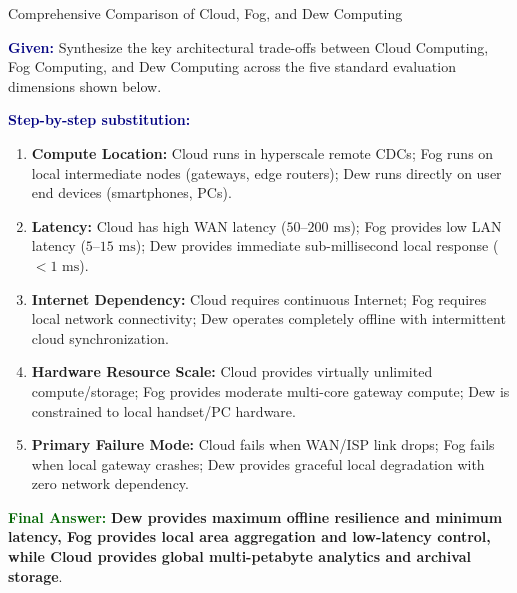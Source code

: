 \documentclass[11pt,a4paper,openany]{report}
\newcommand{\Given}{\par\textbf{\textcolor{navy}{Given:}} }
\newcommand{\Steps}{\par\textbf{\textcolor{navy}{Step-by-step substitution:}}\par}
\newcommand{\Answer}{\par\textbf{\textcolor{darkgreen}{Final Answer:}} }
\begin{document}
\begin{solved}{Comprehensive Comparison of Cloud, Fog, and Dew Computing}
\Given Synthesize the key architectural trade-offs between Cloud Computing, Fog Computing, and Dew Computing across the five standard evaluation dimensions shown below.
\Steps
\begin{enumerate}[leftmargin=*]
  \item \textbf{Compute Location:} Cloud runs in hyperscale remote CDCs; Fog runs on local intermediate nodes (gateways, edge routers); Dew runs directly on user end devices (smartphones, PCs).
  \item \textbf{Latency:} Cloud has high WAN latency ($50\text{--}200\text{ ms}$); Fog provides low LAN latency ($5\text{--}15\text{ ms}$); Dew provides immediate sub-millisecond local response ($< 1\text{ ms}$).
  \item \textbf{Internet Dependency:} Cloud requires continuous Internet; Fog requires local network connectivity; Dew operates completely offline with intermittent cloud synchronization.
  \item \textbf{Hardware Resource Scale:} Cloud provides virtually unlimited compute/storage; Fog provides moderate multi-core gateway compute; Dew is constrained to local handset/PC hardware.
  \item \textbf{Primary Failure Mode:} Cloud fails when WAN/ISP link drops; Fog fails when local gateway crashes; Dew provides graceful local degradation with zero network dependency.
\end{enumerate}
\Answer \textbf{Dew provides maximum offline resilience and minimum latency, Fog provides local area aggregation and low-latency control, while Cloud provides global multi-petabyte analytics and archival storage}.
\end{solved}
\end{document}
